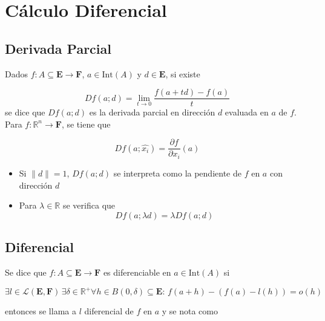 \section{Cálculo Diferencial}

\subsection{Derivada Parcial}

Dados $f:A\subseteq\mathbf{E}\to\mathbf{F}$, $a\in\mathrm{Int}(A)$ y $d\in\mathbf{E}$, si existe

\[Df(a;d)=\lim_{t\to 0}\frac{f(a+td)-f(a)}{t}\]
\bigbreak
se dice que $Df(a;d)$ es la derivada parcial en dirección $d$ evaluada en $a$ de $f$.
\bigbreak
Para $f:\mathbb{R}^n\to\mathbf{F}$, se tiene que

\[Df(a;\hat{x_i})=\frac{\partial f}{\partial x_i}(a)\]
\bigbreak
\begin{itemize}
    \item Si $\|d\|=1$, $Df(a;d)$ se interpreta como la pendiente de $f$ en $a$ con dirección $d$
    \item Para $\lambda\in\mathbb{R}$ se verifica que
    \[Df(a;\lambda d)=\lambda Df(a;d)\]
\end{itemize}

\subsection{Diferencial}

Se dice que $f:A\subseteq\mathbf{E}\to\mathbf{F}$ es diferenciable en $a\in\mathrm{Int}(A)$ si

\[\exists l\in\mathcal{L}(\mathbf{E},\mathbf{F})\,
\exists\delta\in\mathbb{R}^+
\forall h\in B(0,\delta)\subseteq\mathbf{E}:\,
f(a+h)-(f(a)-l(h))=o(h)\]

entonces se llama a $l$ diferencial de $f$ en $a$ y se nota como

